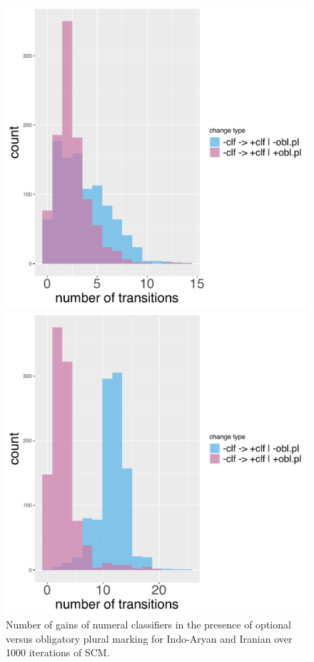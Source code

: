 \documentclass[11pt]{article}
\begin{document}
\begin{figure}[t!]
%
\begin{minipage}[t]{.45\linewidth}
\includegraphics[width=\linewidth]{code/ia_transitions.pdf}
\end{minipage}
\hspace{.05\linewidth}
\begin{minipage}[t]{.45\linewidth}
\includegraphics[width=\linewidth]{code/iran_transitions.pdf}
\end{minipage}
\caption{Number of gains of numeral classifiers in the presence of optional versus obligatory plural marking for Indo-Aryan and Iranian over 1000 iterations of SCM.}
\label{ia_ir_scm}
\end{figure}
\end{document}
